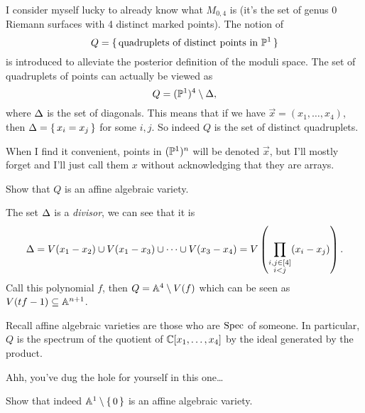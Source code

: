 \documentclass[12pt]{memoir}
\begin{document}
I consider myself lucky to already know what $M_{0,4}$ is (it's the set of genus 0 Riemann surfaces with 4 distinct marked points). The notion of 
$$Q=\{\,\text{quadruplets of distinct points in }\mathbb{P}^1\,\}$$
is introduced to alleviate the posterior definition of the moduli space. The set of quadruplets of points can actually be viewed as 
$$Q=(\mathbb{P}^1)^4\setminus\Delta,$$
where $\Delta$ is the set of diagonals. This means that if we have $\vec x=(x_1,\dots,x_4)$, then $\Delta=\{\,x_i=x_j\,\}$ for some $i,j$. So indeed $Q$ is the set of distinct quadruplets. 

\begin{Rmk}
    When I find it convenient, points in $(\mathbb{P}^1)^n$ will be denoted $\vec x$, but I'll mostly forget and I'll just call them $x$ without acknowledging that they are arrays.
\end{Rmk}

\begin{Ej}
Show that $Q$ is an affine algebraic variety. 
\end{Ej}

\begin{ptcb}
    The set $\Delta$ is a \emph{divisor}, we can see that it is 
    $$\Delta=V(x_1-x_2)\cup V(x_1-x_3)\cup\cdots\cup V(x_3-x_4)=V\left(\prod_{\substack{i,j\in\left\lbrack4\right\rbrack\\ i<j}}(x_i-x_j)\right).$$
    Call this polynomial $f$, then $Q=\mathbb{A}^4\setminus V(f)$ which can be seen as $V(tf-1)\subseteq \mathbb{A}^{n+1}$.
    \end{ptcb}

\begin{Rmk}
    Recall affine algebraic varieties are those who are $\operatorname{Spec}$ of someone. In particular, $Q$ is the spectrum of the quotient of $\mathbb{C}[x_1,\dots,x_4]$ by the ideal generated by the product.
\end{Rmk}

Ahh, you've dug the hole for yourself in this one\dots

\begin{Ej}
    Show that indeed $\mathbb{A}^1\setminus\{\,0\,\}$ is an affine algebraic variety.
\end{Ej}
\end{document}
